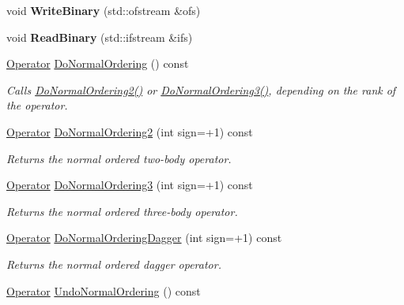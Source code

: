 \begin{DoxyCompactItemize}
\item 
\hypertarget{classOperator_aa3a24681b6b5b5a3e5ef259e418611d9}{void {\bfseries Write\-Binary} (std\-::ofstream \&ofs)}\label{classOperator_aa3a24681b6b5b5a3e5ef259e418611d9}

\item 
\hypertarget{classOperator_ad914caae3f2e24606e429da96eb70300}{void {\bfseries Read\-Binary} (std\-::ifstream \&ifs)}\label{classOperator_ad914caae3f2e24606e429da96eb70300}

\item 
\hypertarget{classOperator_a67551726746426506dd9bb397a4ae4f9}{\hyperlink{classOperator}{Operator} \hyperlink{classOperator_a67551726746426506dd9bb397a4ae4f9}{Do\-Normal\-Ordering} () const }\label{classOperator_a67551726746426506dd9bb397a4ae4f9}

\begin{DoxyCompactList}\small\item\em Calls \hyperlink{classOperator_a806dec94b274e17c73e16d7ad837e201}{Do\-Normal\-Ordering2()} or \hyperlink{classOperator_aff2ff73ab54e99036cf699fc1bfeee02}{Do\-Normal\-Ordering3()}, depending on the rank of the operator. \end{DoxyCompactList}\item 
\hyperlink{classOperator}{Operator} \hyperlink{classOperator_a806dec94b274e17c73e16d7ad837e201}{Do\-Normal\-Ordering2} (int sign=+1) const 
\begin{DoxyCompactList}\small\item\em Returns the normal ordered two-\/body operator. \end{DoxyCompactList}\item 
\hyperlink{classOperator}{Operator} \hyperlink{classOperator_aff2ff73ab54e99036cf699fc1bfeee02}{Do\-Normal\-Ordering3} (int sign=+1) const 
\begin{DoxyCompactList}\small\item\em Returns the normal ordered three-\/body operator. \end{DoxyCompactList}\item 
\hyperlink{classOperator}{Operator} \hyperlink{classOperator_ae42c83c56a34fa58dcf59676b163b8a9}{Do\-Normal\-Ordering\-Dagger} (int sign=+1) const 
\begin{DoxyCompactList}\small\item\em Returns the normal ordered dagger operator. \end{DoxyCompactList}\item 
\hypertarget{classOperator_a5fd8c62bf910df71736eb2b8bcf60ca5}{\hyperlink{classOperator}{Operator} \hyperlink{classOperator_a5fd8c62bf910df71736eb2b8bcf60ca5}{Undo\-Normal\-Ordering} () const }\label{classOperator_a5fd8c62bf910df71736eb2b8bcf60ca5}


\end{DoxyCompactItemize}
